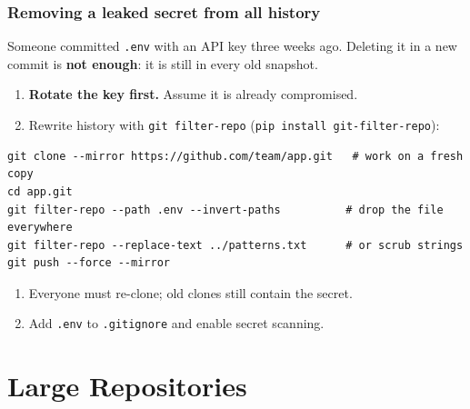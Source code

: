 \documentclass[aspectratio=169,10pt,compress]{beamer}
\newcommand{\cmd}[1]{\texttt{\color{gitred}#1}}
\begin{document}
\begin{frame}[t,fragile] \frametitle{Removing a leaked secret from all history}
  Someone committed \texttt{.env} with an API key three weeks ago.
  Deleting it in a new commit is \textbf{not enough}: it is still in every old snapshot.

  \vspace{0.3em}
  \begin{enumerate}\small
    \item \textbf{Rotate the key first.} Assume it is already compromised.
    \item Rewrite history with \texttt{git filter-repo} (\cmd{pip install git-filter-repo}):
  \end{enumerate}
\begin{lstlisting}
git clone --mirror https://github.com/team/app.git   # work on a fresh copy
cd app.git
git filter-repo --path .env --invert-paths          # drop the file everywhere
git filter-repo --replace-text ../patterns.txt      # or scrub strings
git push --force --mirror
\end{lstlisting}
  \begin{enumerate}\small
    \setcounter{enumi}{2}
    \item Everyone must re-clone; old clones still contain the secret.
    \item Add \texttt{.env} to \texttt{.gitignore} and enable secret scanning.
  \end{enumerate}
\end{frame}

\section[Scale]{Large Repositories}
\end{document}
